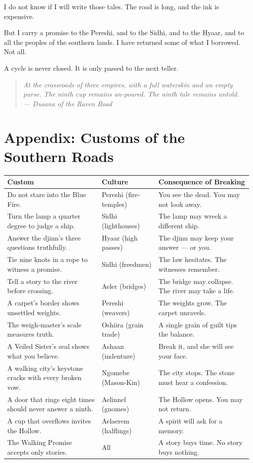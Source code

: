 \documentclass[10pt,twoside]{book}
\newcommand{\dusana}[1]{\begin{quote}\itshape #1 \\ --- Dusana of the Raven Road\end{quote}}
\begin{document}
I do not know if I will write those tales. The road is long, and the ink is expensive.

But I carry a promise to the Pereshi, and to the Sidhi, and to the Hyaar, and to all the peoples of the southern lands. I have returned some of what I borrowed. Not all.

A cycle is never closed. It is only passed to the next teller.

\dusana{At the crossroads of three empires, with a full waterskin and an empty purse. The ninth cup remains un-poured. The ninth tale remains untold.}

\chapter*{Appendix: Customs of the Southern Roads}

\begin{table}[h]
\centering
\begin{tabularx}{\textwidth}{p{4cm} p{4cm} X}
\toprule
\textbf{Custom} & \textbf{Culture} & \textbf{Consequence of Breaking} \\
\midrule
Do not stare into the Blue Fire. & Pereshi (fire-temples) & You see the dead. You may not look away. \\
Turn the lamp a quarter degree to judge a ship. & Sidhi (lighthouses) & The lamp may wreck a different ship. \\
Answer the djinn's three questions truthfully. & Hyaar (high passes) & The djinn may keep your answer --- or you. \\
Tie nine knots in a rope to witness a promise. & Sidhi (freedmen) & The law hesitates. The witnesses remember. \\
Tell a story to the river before crossing. & Aeler (bridges) & The bridge may collapse. The river may take a life. \\
A carpet's border shows unsettled weights. & Pereshi (weavers) & The weights grow. The carpet unravels. \\
The weigh-master's scale measures truth. & Oshiira (grain trade) & A single grain of guilt tips the balance. \\
A Veiled Sister's seal shows what you believe. & Ashaan (indenture) & Break it, and she will see your face. \\
A walking city's keystone cracks with every broken vow. & Ngomebe (Mason-Kin) & The city stops. The stone must hear a confession. \\
A door that rings eight times should never answer a ninth. & Aelinnel (gnomes) & The Hollow opens. You may not return. \\
A cup that overflows invites the Hollow. & Aelaerem (halflings) & A spirit will ask for a memory. \\
The Walking Promise accepts only stories. & All & A story buys time. No story buys nothing. \\
\bottomrule
\end{tabularx}
\end{table}
\end{document}
